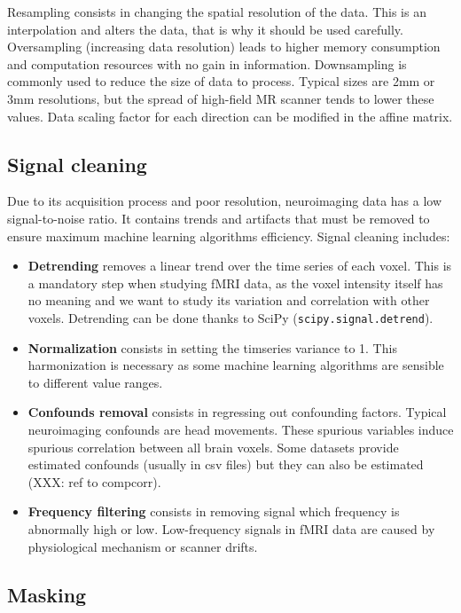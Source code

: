 \documentclass{frontiersSCNS} %
\begin{document}
Resampling consists in changing the spatial resolution of the data. This is
an interpolation and alters the data, that is why it should be used carefully.
Oversampling (increasing data resolution) leads to higher memory consumption
and computation resources with no gain in information.
Downsampling is commonly used to reduce the size of data to process.
Typical sizes are 2mm or 3mm resolutions, but the spread of high-field MR
scanner tends to lower these values.
Data scaling factor for each direction can be modified in the affine matrix.

\subsection{Signal cleaning}

Due to its acquisition process and poor resolution, neuroimaging data has a low
signal-to-noise ratio. It contains trends and artifacts that must be removed
to ensure maximum machine learning algorithms efficiency. Signal cleaning
includes:
\begin{itemize}
    \item{\bf Detrending} removes a linear trend over the time series of each
        voxel. This is a mandatory step when studying fMRI data, as the voxel
        intensity itself has no meaning and we want to study its variation and
        correlation with other voxels. Detrending can be done thanks to SciPy
        (\texttt{scipy.signal.detrend}).
    \item{\bf Normalization} consists in setting the timseries variance to 1.
        This harmonization is necessary as some machine learning algorithms are
        sensible to different value ranges.
    \item{\bf Confounds removal} consists in regressing out confounding factors.
        Typical neuroimaging confounds are head movements. These spurious
        variables induce spurious correlation between all brain voxels.
        Some datasets provide estimated confounds (usually in csv files) but
        they can also be estimated (XXX: ref to compcorr).
    \item{\bf Frequency filtering} consists in removing signal which frequency is
        abnormally high or low. Low-frequency signals in fMRI data are caused by
        physiological mechanism or scanner drifts.
\end{itemize}

\subsection{Masking}
\end{document}
